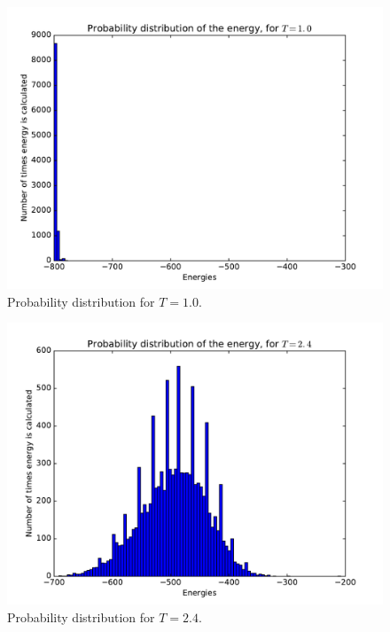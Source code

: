 \documentclass[12pt]{article}
\begin{document}
\begin{figure}[H]
\centering
\includegraphics[width=\linewidth]{Plots/Probability_distribution_T1.pdf}
\caption{Probability distribution for $T=1.0$.}
\end{figure}

\begin{figure}[H]
\centering
\includegraphics[width=\linewidth]{Plots/Probability_distribution_T2.pdf}
\caption{Probability distribution for $T=2.4$.}
\end{figure}
\end{document}

